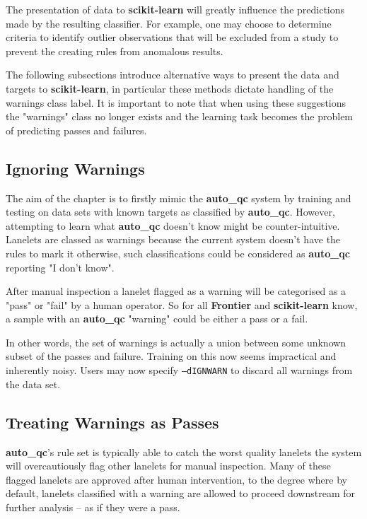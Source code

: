 The presentation of data to \textbf{scikit-learn} will greatly influence the
predictions made by the resulting classifier. For example, one may choose to
determine criteria to identify outlier observations that will be excluded from a
study to prevent the creating rules from anomalous results.

The following subsections introduce alternative ways to present the data and
targets to \textbf{scikit-learn}, in particular these methods dictate handling
of the warnings class label. It is important to note that when using these
suggestions the "warnings" class no longer exists and the learning task becomes
the problem of predicting passes and failures.

\subsection{Ignoring Warnings}

The aim of the chapter is to firstly mimic the \textbf{auto\_qc} system by
training and testing on data sets with known targets as classified by
\textbf{auto\_qc}. However, attempting to learn what \textbf{auto\_qc} doesn't
know might be counter-intuitive. Lanelets are classed as warnings because the
current system doesn't have the rules to mark it otherwise, such classifications
could be considered as \textbf{auto\_qc} reporting "I don't know".

After manual inspection a lanelet flagged as a warning will be categorised as a
"pass" or "fail" by a human operator. So for all \textbf{Frontier} and
\textbf{scikit-learn} know, a sample with an \textbf{auto\_qc} "warning" could
be either a pass or a fail.

In other words, the set of warnings is actually a union between some unknown
subset of the passes and failure. Training on this now seems impractical and
inherently noisy. Users may now specify \texttt{--dIGNWARN}
to discard all warnings from the data set.


\subsection{Treating Warnings as Passes}

\textbf{auto\_qc}'s rule set is typically able to catch the worst quality
lanelets the system will overcautiously flag other lanelets for manual
inspection. Many of these flagged lanelets are approved after human
intervention, to the degree where by default, lanelets classified with a warning
are allowed to proceed downstream for further analysis -- as if they were a
pass.

